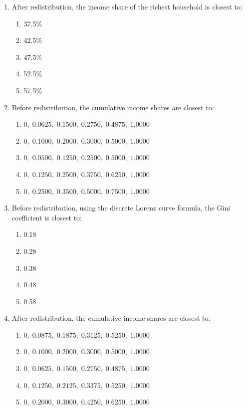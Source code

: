 \documentclass[12pt]{article}
\begin{document}
\begin{enumerate}[label=\textbf{\arabic*.}]
\item After redistribution, the income share of the richest household is closest to:
\begin{enumerate}[label=\Alph*.]
\item 37.5\%
\item 42.5\%
\item 47.5\%
\item 52.5\%
\item 57.5\%
\end{enumerate}

\item Before redistribution, the cumulative income shares are closest to:
\begin{enumerate}[label=\Alph*.]
\item \(0,\;0.0625,\;0.1500,\;0.2750,\;0.4875,\;1.0000\)
\item \(0,\;0.1000,\;0.2000,\;0.3000,\;0.5000,\;1.0000\)
\item \(0,\;0.0500,\;0.1250,\;0.2500,\;0.5000,\;1.0000\)
\item \(0,\;0.1250,\;0.2500,\;0.3750,\;0.6250,\;1.0000\)
\item \(0,\;0.2500,\;0.3500,\;0.5000,\;0.7500,\;1.0000\)
\end{enumerate}

\item Before redistribution, using the discrete Lorenz curve formula, the Gini coefficient is closest to:
\begin{enumerate}[label=\Alph*.]
\item 0.18
\item 0.28
\item 0.38
\item 0.48
\item 0.58
\end{enumerate}

\item After redistribution, the cumulative income shares are closest to:
\begin{enumerate}[label=\Alph*.]
\item \(0,\;0.0875,\;0.1875,\;0.3125,\;0.5250,\;1.0000\)
\item \(0,\;0.1000,\;0.2000,\;0.3000,\;0.5000,\;1.0000\)
\item \(0,\;0.0625,\;0.1500,\;0.2750,\;0.4875,\;1.0000\)
\item \(0,\;0.1250,\;0.2125,\;0.3375,\;0.5250,\;1.0000\)
\item \(0,\;0.2000,\;0.3000,\;0.4250,\;0.6250,\;1.0000\)
\end{enumerate}


\end{enumerate}
\end{document}
